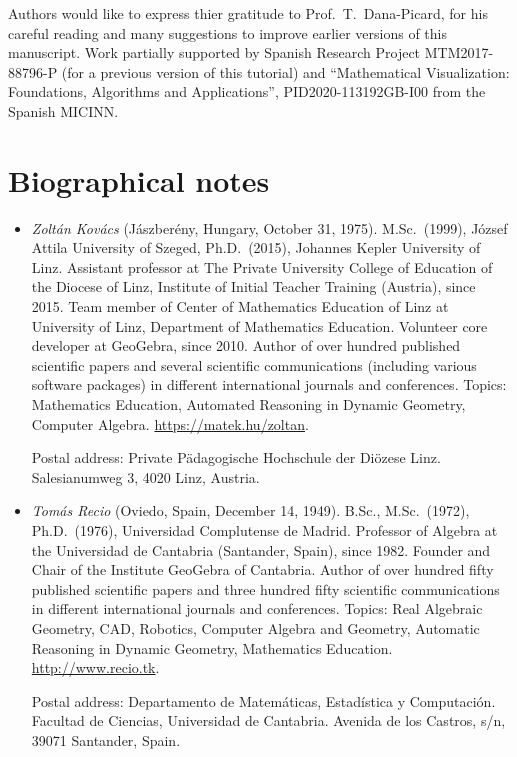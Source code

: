 \documentclass{article}
\begin{document}
Authors would like to express thier gratitude to Prof.~T.~Dana-Picard,
for his careful reading and many suggestions to improve earlier versions
of this manuscript.  Work partially supported by Spanish Research
Project MTM2017-88796-P (for a previous version of this tutorial) and
``Mathematical Visualization: Foundations, Algorithms and Applications'',
PID2020-113192GB-I00 from the Spanish MICINN. 

\section*{Biographical notes}

\begin{itemize}

\item
\textit{Zolt\'an Kov\'acs} (J\'aszber\'eny, Hungary, October 31, 1975). M.Sc.~(1999),
J\'ozsef Attila University of Szeged,
Ph.D.~(2015), Johannes Kepler University of Linz. Assistant professor at
The Private University College of Education of the Diocese of Linz, Institute of Initial Teacher Training (Austria),
since 2015.
Team member of Center of Mathematics Education of Linz at University of Linz, Department of Mathematics Education.
Volunteer core developer at GeoGebra, since 2010.
Author of over hundred published scientific papers and several scientific
communications (including various software packages) in different international journals and conferences.
Topics: Mathematics Education, Automated Reasoning in Dynamic Geometry, Computer Algebra.
\url{https://matek.hu/zoltan}.

Postal address: Private P\"adagogische Hochschule der Di\"ozese Linz.
Salesianumweg 3, 4020 Linz, Austria.

\item
\textit{Tom\'as Recio} (Oviedo, Spain, December 14, 1949).  B.Sc., M.Sc.~(1972),
Ph.D.~(1976), Universidad Complutense de Madrid. Professor of Algebra
at the Universidad de Cantabria (Santander, Spain), since 1982. Founder
and Chair of the Institute GeoGebra of Cantabria.
Author of over hundred
fifty published scientific papers and three hundred fifty scientific
communications in different international journals and conferences.
Topics: Real Algebraic Geometry, CAD, Robotics, Computer Algebra and
Geometry,  Automatic Reasoning in Dynamic Geometry, Mathematics
Education. \url{http://www.recio.tk}.

Postal address: Departamento de Matem\'aticas, Estadística y Computaci\'on.
Facultad de Ciencias, Universidad de Cantabria. Avenida de los Castros, s/n,
39071 Santander, Spain.


\end{itemize}
\end{document}

